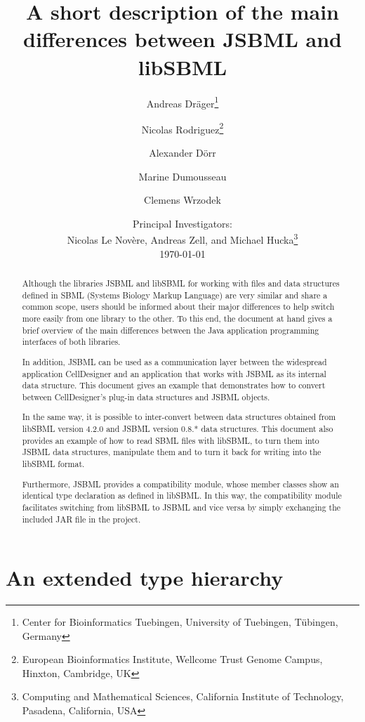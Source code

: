 \documentclass[
  BCOR12mm,
  letterpaper,
  11pt,
  headsepline,
  pointlessnumbers,
  tablecaptionabove,
  onelinecaption,
  headinclude,
  appendixprefix,
  idxtotoc,
  bibtotoc,
  twoside,
  titlepage
]{scrartcl}
\title{A short description of the main differences between JSBML and libSBML}
\author{Andreas Dr\"ager\thanks{Center for Bioinformatics Tuebingen, University
of Tuebingen, T\"ubingen, Germany}\and%
Nicolas Rodriguez\thanks{European Bioinformatics Institute, Wellcome Trust
Genome Campus, Hinxton, Cambridge, UK}\and%
Alexander D\"orr\footnotemark[1]\and%
Marine Dumousseau\footnotemark[2]\and%
Clemens Wrzodek\footnotemark[1]}
\date{Principal Investigators:\\
Nicolas Le Nov{\`e}re\footnotemark[2], Andreas Zell\footnotemark[1], and Michael
Hucka\thanks{Computing and Mathematical Sciences, California Institute of
Technology, Pasadena, California, USA}\\[4ex]
\today}
\begin{document}
\maketitle
\tableofcontents

\begin{abstract}
Although the libraries JSBML and libSBML for working with files and data
structures defined in SBML (Systems Biology Markup Language) are
very similar and share a common scope, users should be informed about their
major differences to help switch more easily from one library to the other. To
this end, the document at hand gives a brief overview of the main differences
between the Java\texttrademark{} application programming interfaces of both
libraries.

In addition, JSBML can be used as a communication layer between the widespread
application CellDesigner and an application that works with JSBML as its
internal data structure. This document gives an example that demonstrates how to
convert between CellDesigner's plug-in data structures and JSBML objects.

In the same way, it is possible to inter-convert between data structures
obtained from libSBML version 4.2.0 and JSBML version 0.8.* data structures.
This document also provides an example of how to read SBML files with libSBML,
to turn them into JSBML data structures, manipulate them and to turn it back for
writing into the libSBML format.

Furthermore, JSBML provides a compatibility module, whose member classes show
an identical type declaration as defined in libSBML. In this way, the
compatibility module facilitates switching from libSBML to JSBML and vice versa
by simply exchanging the included JAR file in the project.
\end{abstract}

\section{An extended type hierarchy}
\end{document}
